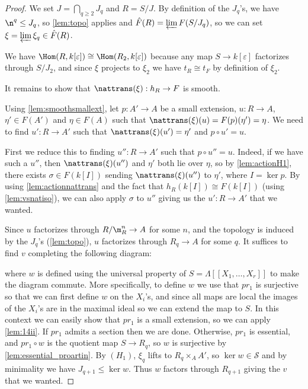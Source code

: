 \begin{proof}
We set $J = \bigcap_{q \ge 2} J_q$ and $R = S / J$. By definition
of the $J_q$'s, we have $\n ^ q \le J_q$, so \cref{lem:topo} applies
and $\hat{F}(R) = \varprojlim F(S/J_q)$, so we can set
$\xi = \varprojlim \xi_q \in \hat{F}(R)$.

We have $\Hom (R, k[\varepsilon]) \cong \Hom (R_2, k[\varepsilon])$
because any map $S \to k[\varepsilon]$ factorizes through $S/J_2$,
and since $\xi$ projects to $\xi_2$ we have $t_R \cong t_F$
by definition of $\xi_2$.

It remains to show that $\nattrans(\xi) : h_R \to F$ is smooth.

Using \cref{lem:smoothsmallext}, let $p : A' \to A$ be a small extension,
$u : R \to A$, $\eta' \in F(A')$ and $\eta \in F(A)$ such that
$\nattrans(\xi) (u) = F(p)(\eta') = \eta$.
We need to find $u' : R \to A'$ such that $\nattrans(\xi) (u') = \eta'$
and $p \circ u' = u$.

First we reduce this to finding $u'' : R \to A'$ such that
$p \circ u'' = u$. Indeed, if we have such a $u''$, then
$\nattrans(\xi) (u'')$ and $\eta'$ both lie over $\eta$,
so by \cref{lem:actionH1}, there exists $\sigma \in F(k[I])$
sending $\nattrans(\xi) (u'')$ to $\eta'$,
where $I = \ker p$.
By using \cref{lem:actionnattrans} and the fact that
$h_R (k[I]) \cong F(k[I])$ (using \cref{lem:vsnatiso}),
we can also apply $\sigma$ to $u''$ giving us the $u' : R \to A'$
that we wanted.

Since $u$ factorizes through $R/\m_R^n \to A$ for some $n$,
and the topology is induced by the $J_q$'s (\cref{lem:topo}),
$u$ factorizes through $R_q \to A$ for some $q$.
It suffices to find $v$ completing the following diagram:
\begin{center}
\label{eq:proofdiagram}
\end{center}
where $w$ is defined using the universal property of
$S = \Lambda [[X_1, \ldots, X_r]]$ to make the diagram commute.
More specifically, to define $w$ we use that $pr_1$ is surjective so that
we can first define $w$ on the $X_i$'s, and since all maps are local the images
of the $X_i$'s are in the maximal ideal so we can extend the map to $S$.
In this context we can easily show that $pr_1$ is a small extension,
so we can apply \cref{lem:14ii}.
If $pr_1$ admits a section then we are done. Otherwise,
$pr_1$ is essential, and $pr_1 \circ w$ is the quotient map $S \to R_q$,
so $w$ is surjective by \cref{lem:essential_proartin}.
By $(H_1)$, $\xi_q$ lifts to $R_q \times_A A'$, so $\ker w \in \mathscr{S}$
and by minimality we have $J_{q+1} \le \ker w$. Thus $w$ factors through
$R_{q+1}$ giving the $v$ that we wanted.


\end{proof}
